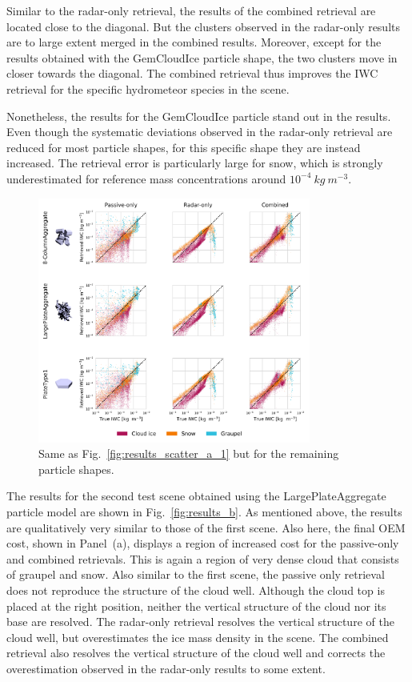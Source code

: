 \documentclass[journal abbreviation, manuscript]{copernicus}
\begin{document}
Similar to the radar-only retrieval, the results of the combined retrieval are
located close to the diagonal. But the clusters observed in the radar-only
results are to large extent merged in the combined results. Moreover, except for
the results obtained with the GemCloudIce particle shape, the two clusters move
in closer towards the diagonal. The combined retrieval thus improves the IWC
retrieval for the specific hydrometeor species in the scene.

Nonetheless, the results for the GemCloudIce particle stand out in the results.
Even though the systematic deviations observed in the radar-only retrieval are
reduced for most particle shapes, for this specific shape they are instead
increased. The retrieval error is particularly large for snow, which is strongly
underestimated for reference mass concentrations around $10^{-4} \ \unit{kg\ m^{-3}}$.

\begin{figure}
\centering
\includegraphics[width = 0.8\textwidth]{../plots/results_scatter_a_2}
\caption{Same as Fig.~\ref{fig:results_scatter_a_1} but for the remaining particle
  shapes.}
\label{fig:results_scatter_a_2}
\end{figure}


The results for the second test scene obtained using the LargePlateAggregate
particle model are shown in Fig.~\ref{fig:results_b}. As mentioned above, the
results are qualitatively very similar to those of the first scene. Also here,
the final OEM cost, shown in Panel~(a), displays a region of increased cost for
the passive-only and combined retrievals. This is again a region of very dense
cloud that consists of graupel and snow. Also similar to the first scene, the
passive only retrieval does not reproduce the structure of the cloud well.
Although the cloud top is placed at the right position, neither the vertical
structure of the cloud nor its base are resolved. The radar-only retrieval
resolves the vertical structure of the cloud well, but overestimates the ice
mass density in the scene. The combined retrieval also resolves the vertical
structure of the cloud well and corrects the overestimation observed in the
radar-only results to some extent.
\end{document}
